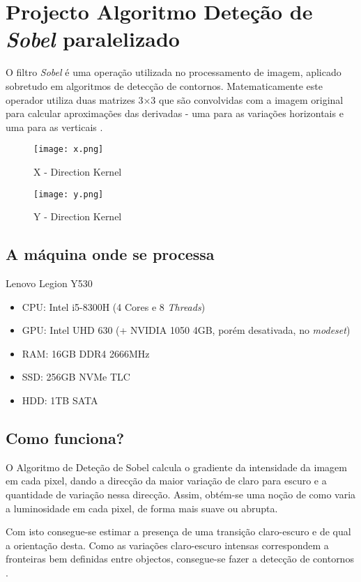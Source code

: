 \documentclass{article}
\begin{document}
\section{Projecto Algoritmo Deteção de \textit{Sobel} paralelizado}
O filtro \textit{Sobel} é uma operação utilizada no processamento de imagem, aplicado sobretudo em algoritmos de detecção de contornos.
Matematicamente este operador utiliza duas matrizes 3×3 que são convolvidas com a imagem original para calcular aproximações das derivadas - uma para as variações horizontais e uma para as verticais \cite{wikipedia}.

\begin{figure}[!htb]
\centering
\texttt{[image: x.png]}
\caption{X - Direction Kernel}
\label{fig:x-kernel}
\end{figure}

\begin{figure}[!htb]
\centering
\texttt{[image: y.png]}
\caption{Y - Direction Kernel}
\label{fig:Login}
\end{figure}



\subsection{A máquina onde se processa}
Lenovo Legion Y530
\begin{itemize}
	\item CPU: Intel i5-8300H (4 Cores e 8 \textit{Threads})
	\item GPU: Intel UHD 630 (+ NVIDIA 1050 4GB, porém desativada, no \textit{modeset})
	\item RAM: 16GB DDR4 2666MHz
	\item SSD: 256GB NVMe TLC
	\item HDD: 1TB SATA
\end{itemize}

\subsection{Como funciona?}
O Algoritmo de Deteção de Sobel calcula o gradiente da intensidade da imagem em cada pixel, dando a direcção da maior variação de claro para escuro e a quantidade de variação nessa direcção. Assim, obtém-se uma noção de como varia a luminosidade em cada pixel, de forma mais suave ou abrupta.

Com isto consegue-se estimar a presença de uma transição claro-escuro e de qual a orientação desta. Como as variações claro-escuro intensas correspondem a fronteiras bem definidas entre objectos, consegue-se fazer a detecção de contornos \cite{jasnau}.
\end{document}
